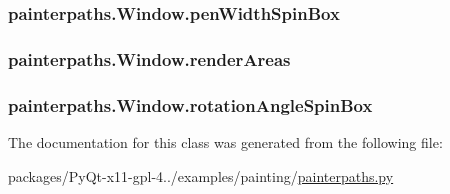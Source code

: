 \subsubsection[{pen\+Width\+Spin\+Box}]{\setlength{\rightskip}{0pt plus 5cm}painterpaths.\+Window.\+pen\+Width\+Spin\+Box}\label{classpainterpaths_1_1Window_a6ff1def8c04f3490a00c505d0db32a9f}
\hypertarget{classpainterpaths_1_1Window_a9af8e95514d8474c2475424776b39dca}{}
\subsubsection[{render\+Areas}]{\setlength{\rightskip}{0pt plus 5cm}painterpaths.\+Window.\+render\+Areas}\label{classpainterpaths_1_1Window_a9af8e95514d8474c2475424776b39dca}
\hypertarget{classpainterpaths_1_1Window_a79047e1eefe88465f770f4aa8578d813}{}
\subsubsection[{rotation\+Angle\+Spin\+Box}]{\setlength{\rightskip}{0pt plus 5cm}painterpaths.\+Window.\+rotation\+Angle\+Spin\+Box}\label{classpainterpaths_1_1Window_a79047e1eefe88465f770f4aa8578d813}


The documentation for this class was generated from the following file\+:\begin{DoxyCompactItemize}
\item 
packages/\+Py\+Qt-\/x11-\/gpl-\/4../examples/painting/\hyperlink{painterpaths_8py}{painterpaths.\+py}\end{DoxyCompactItemize}
